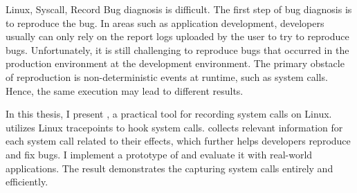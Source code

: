 
\begin{英文摘要}{Linux, Syscall, Record}
    Bug diagnosis is difficult. The first step of bug diagnosis is to reproduce the bug. In areas such as application development, developers usually can only rely on the report logs uploaded by the user to try to reproduce bugs.
    Unfortunately, it is still challenging to reproduce bugs that occurred in the production environment at the development environment. The primary obstacle of reproduction is non-deterministic events at runtime, such as system calls. Hence,  the same execution may lead to different results.

    In this thesis, I present \TheName, a practical tool for recording system calls on Linux. \TheName utilizes Linux tracepoints to hook system calls.
    \TheName collects relevant information for each system call related to their effects, which further helps developers reproduce and fix bugs. I implement a prototype of \TheName and evaluate it with real-world applications. The result demonstrates the \TheName capturing system calls entirely and efficiently. 
\end{英文摘要}
